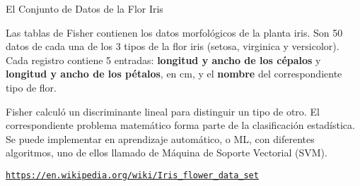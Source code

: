 \documentclass[10pd,hyperref={colorlinks=true}]{beamer}
\begin{document}

\begin{frame}{El Conjunto de Datos de la Flor Iris}

 Las tablas de Fisher contienen los datos morfol\'ogicos de la planta 
iris. Son 50 datos de cada una de los 3 tipos de la flor iris (setosa, 
virginica y versicolor). Cada registro contiene 5 entradas: {\bf 
longitud y ancho de los c\'epalos} y {\bf longitud y ancho de los 
p\'etalos}, en cm, y el {\bf nombre} del correspondiente tipo de flor.

Fisher calcul\'o un discriminante lineal para distinguir un tipo de 
otro. El correspondiente problema matem\'atico forma parte de la 
clasificaci\'on estad\'istica. Se puede implementar en aprendizaje 
autom\'atico, o ML, con diferentes algoritmos, uno de ellos llamado de 
M\'aquina de Soporte Vectorial (SVM).

\centerline{\texttt{\url{https://en.wikipedia.org/wiki/Iris\_flower\_data\_set}}}

 \end{frame}


 \begin{frame}{}

 \vfill
 \centerline{}

 \centerline{}
 \vfill

 \end{frame}

\end{document}
